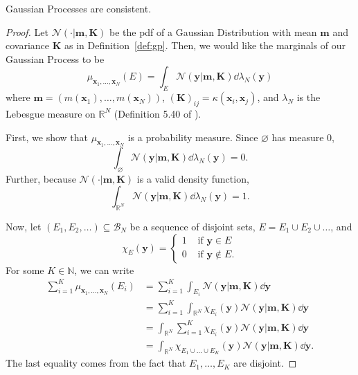 \begin{theorem}
    \label{thm:gp-const}
    Gaussian Processes are consistent.
\end{theorem}
\begin{proof}
    Let $\mathcal{N}( \cdot | \mathbf{m}, \mathbf{K})$
    be the pdf of a Gaussian Distribution with mean $\mathbf{m}$ and covariance $\mathbf{K}$ as in Definition~\ref{def:gp}.
    Then, we would like the marginals of our Gaussian Process to be
    \begin{equation*}
        \mu_{\mathbf{x}_1, \dots, \mathbf{x}_N}(E)
        = \int_{E} \mathcal{N}( \mathbf{y} | \mathbf{m}, \mathbf{K}) \dd \lambda_N(\mathbf{y})
    \end{equation*}
    where $\mathbf{m} = (m(\mathbf{x}_1), \dots, m(\mathbf{x}_N))$,
    $(\mathbf{K})_{ij} = \kappa(\mathbf{x}_i, \mathbf{x}_j)$, and
    $\lambda_N$ is the Lebesgue measure on $\mathbb{R}^{N}$ (Definition 5.40 of \cite{axler2020}).

    First, we show that $\mu_{\mathbf{x}_1, \dots, \mathbf{x}_N}$ is a probability measure.
    Since $\varnothing$ has measure 0,
    \begin{equation*}
        \int_{\varnothing} \mathcal{N}(\mathbf{y} | \mathbf{m}, \mathbf{K}) \dd \lambda_N(\mathbf{y}) = 0.
    \end{equation*}
    Further, because $\mathcal{N}( \cdot | \mathbf{m}, \mathbf{K})$ is a valid density function,
    \begin{equation*}
        \int_{\mathbb{R}^{N}} \mathcal{N}(\mathbf{y} | \mathbf{m}, \mathbf{K}) \dd \lambda_N(\mathbf{y}) = 1.
    \end{equation*}

    Now, let $(E_1, E_2, \dots) \subseteq \mathcal{B}_{N}$ be a sequence of disjoint sets, $E = E_1 \cup E_2 \cup \dots$, and
    \begin{equation*}
        \chi_{E}(\mathbf{y}) =
        \begin{cases}
            1 & \text{ if $\mathbf{y} \in E$} \\
            0 & \text{ if $\mathbf{y} \notin E$}.
        \end{cases}
    \end{equation*}
    For some $K \in \mathbb{N}$, we can write
    \begin{align*}
        \sum_{i = 1}^{K} \mu_{\mathbf{x}_1, \dots, \mathbf{x}_N}(E_i)
        & = \sum_{i = 1}^{K} \int_{E_i} \mathcal{N}(\mathbf{y} | \mathbf{m}, \mathbf{K}) \dd \mathbf{y} \\
        & = \sum_{i = 1}^{K} \int_{\mathbb{R}^{N}} \chi_{E_i}(\mathbf{y})\mathcal{N}(\mathbf{y} | \mathbf{m}, \mathbf{K}) \dd \mathbf{y} \\
        & =  \int_{\mathbb{R}^{N}} \sum_{i = 1}^{K}\chi_{E_i}(\mathbf{y})\mathcal{N}(\mathbf{y} | \mathbf{m}, \mathbf{K}) \dd \mathbf{y} \\
        & =  \int_{\mathbb{R}^{N}} \chi_{E_1 \cup \dots \cup E_K}(\mathbf{y})\mathcal{N}(\mathbf{y} | \mathbf{m}, \mathbf{K}) \dd \mathbf{y}.
    \end{align*}
    The last equality comes from the fact that $E_1, \dots, E_K$ are disjoint.


\end{proof}

